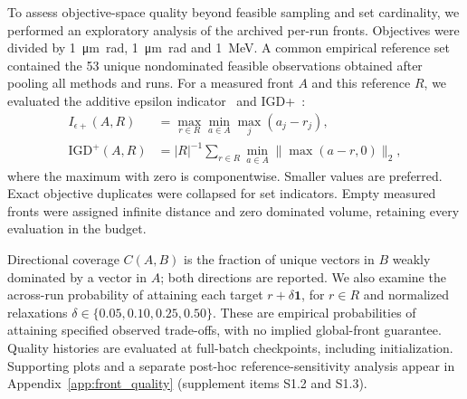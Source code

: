 \documentclass[aps,prab,reprint,superscriptaddress,amsmath,amssymb,floatfix]{revtex4-2}
\begin{document}
To assess objective-space quality beyond feasible sampling and set cardinality, we performed
an exploratory analysis of the archived per-run fronts. Objectives were divided by
\SI{1}{\micro\metre\radian}, \SI{1}{\micro\metre\radian} and \SI{1}{\mega\electronvolt}.
A common empirical reference set contained the 53 unique nondominated feasible observations
obtained after pooling all methods and runs. For a measured front $A$ and this reference $R$,
we evaluated the additive epsilon indicator~\cite{Zitzler2003Assessment} and
IGD+~\cite{Ishibuchi2015IGD}:
\begin{align}
I_{\epsilon+}(A,R)&=\max_{r\in R}\min_{a\in A}\max_j(a_j-r_j),\\
\mathrm{IGD}^{+}(A,R)&=|R|^{-1}\sum_{r\in R}\min_{a\in A}\|\max(a-r,0)\|_2,
\end{align}
where the maximum with zero is componentwise. Smaller values are preferred. Exact objective
duplicates were collapsed for set indicators. Empty measured fronts were assigned infinite
distance and zero dominated volume, retaining every evaluation in the budget.


Directional coverage $C(A,B)$ is the fraction of unique vectors in $B$ weakly dominated
by a vector in $A$; both directions are reported. We also examine the across-run probability
of attaining each target $r+\delta\mathbf{1}$, for $r\in R$ and normalized relaxations
$\delta\in\{0.05,0.10,0.25,0.50\}$. These are empirical probabilities of attaining specified
observed trade-offs, with no implied global-front guarantee. Quality histories are evaluated
at full-batch checkpoints, including initialization. Supporting plots and a separate post-hoc
reference-sensitivity analysis appear in Appendix~\ref{app:front_quality} (supplement items S1.2
and S1.3).
\end{document}
